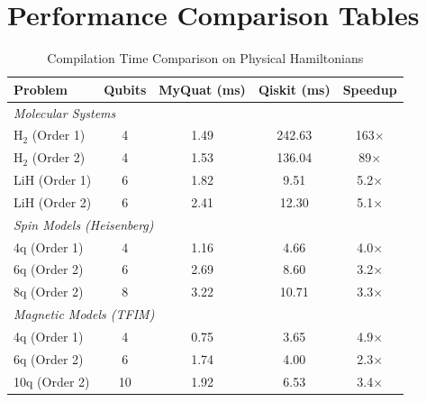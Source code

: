 
\section{Performance Comparison Tables}

\begin{table}[h]
\centering
\caption{Compilation Time Comparison on Physical Hamiltonians}
\label{tab:compilation_speed}
\begin{tabular}{lcccc}
\hline
\textbf{Problem} & \textbf{Qubits} & \textbf{MyQuat (ms)} & \textbf{Qiskit (ms)} & \textbf{Speedup} \\
\hline
\multicolumn{5}{l}{\textit{Molecular Systems}} \\
H$_2$ (Order 1) & 4 & 1.49 & 242.63 & 163$\times$ \\
H$_2$ (Order 2) & 4 & 1.53 & 136.04 & 89$\times$ \\
LiH (Order 1) & 6 & 1.82 & 9.51 & 5.2$\times$ \\
LiH (Order 2) & 6 & 2.41 & 12.30 & 5.1$\times$ \\
\hline
\multicolumn{5}{l}{\textit{Spin Models (Heisenberg)}} \\
4q (Order 1) & 4 & 1.16 & 4.66 & 4.0$\times$ \\
6q (Order 2) & 6 & 2.69 & 8.60 & 3.2$\times$ \\
8q (Order 2) & 8 & 3.22 & 10.71 & 3.3$\times$ \\
\hline
\multicolumn{5}{l}{\textit{Magnetic Models (TFIM)}} \\
4q (Order 1) & 4 & 0.75 & 3.65 & 4.9$\times$ \\
6q (Order 2) & 6 & 1.74 & 4.00 & 2.3$\times$ \\
10q (Order 2) & 10 & 1.92 & 6.53 & 3.4$\times$ \\
\hline
\end{tabular}
\end{table}

